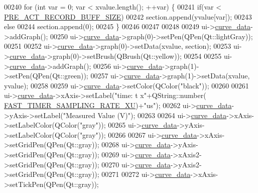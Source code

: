 \begin{DoxyCode}
00240     \textcolor{keywordflow}{for} (\textcolor{keywordtype}{int} var = 0; var < xvalue.length(); ++var) \{
00241         \textcolor{keywordflow}{if}(var < \hyperlink{a00006_a18dcecc16ded13fa622e0913e73442e6}{PRE\_ACT\_RECORD\_BUFF\_SIZE})
00242         section.append(yvalue[var]);
00243         \textcolor{keywordflow}{else}
00244         section.append(0);
00245     \}
00246 
00247 
00248 
00249     ui->\hyperlink{a00081_a247d94481323c0bc4f8b6458a8a535dd}{curve\_data}->addGraph();
00250     ui->\hyperlink{a00081_a247d94481323c0bc4f8b6458a8a535dd}{curve\_data}->graph(0)->setPen(QPen(Qt::lightGray));
00251 
00252     ui->\hyperlink{a00081_a247d94481323c0bc4f8b6458a8a535dd}{curve\_data}->graph(0)->setData(xvalue, section);
00253     ui->\hyperlink{a00081_a247d94481323c0bc4f8b6458a8a535dd}{curve\_data}->graph(0)->setBrush(QBrush(Qt::yellow));
00254 
00255     ui->\hyperlink{a00081_a247d94481323c0bc4f8b6458a8a535dd}{curve\_data}->addGraph();
00256     ui->\hyperlink{a00081_a247d94481323c0bc4f8b6458a8a535dd}{curve\_data}->graph(1)->setPen(QPen(Qt::green));
00257     ui->\hyperlink{a00081_a247d94481323c0bc4f8b6458a8a535dd}{curve\_data}->graph(1)->setData(xvalue, yvalue);
00258 
00259      ui->\hyperlink{a00081_a247d94481323c0bc4f8b6458a8a535dd}{curve\_data}->setColor(QColor(\textcolor{stringliteral}{"black"}));
00260 
00261     ui->\hyperlink{a00081_a247d94481323c0bc4f8b6458a8a535dd}{curve\_data}->xAxis->setLabel(\textcolor{stringliteral}{"time:  t x"}+QString::number(
      \hyperlink{a00086_a87ea9a0eaa474d8b8f672cfa5cbb091f}{FAST\_TIMER\_SAMPLING\_RATE\_XU})+\textcolor{stringliteral}{"us"});
00262     ui->\hyperlink{a00081_a247d94481323c0bc4f8b6458a8a535dd}{curve\_data}->yAxis->setLabel(\textcolor{stringliteral}{"Measured Value (V)"});
00263 
00264     ui->\hyperlink{a00081_a247d94481323c0bc4f8b6458a8a535dd}{curve\_data}->xAxis->setLabelColor(QColor(\textcolor{stringliteral}{"gray"}));
00265     ui->\hyperlink{a00081_a247d94481323c0bc4f8b6458a8a535dd}{curve\_data}->yAxis->setLabelColor(QColor(\textcolor{stringliteral}{"gray"}));
00266 
00267     ui->\hyperlink{a00081_a247d94481323c0bc4f8b6458a8a535dd}{curve\_data}->xAxis->setGridPen(QPen(Qt::gray));
00268     ui->\hyperlink{a00081_a247d94481323c0bc4f8b6458a8a535dd}{curve\_data}->yAxis->setGridPen(QPen(Qt::gray));
00269     ui->\hyperlink{a00081_a247d94481323c0bc4f8b6458a8a535dd}{curve\_data}->xAxis2->setGridPen(QPen(Qt::gray));
00270     ui->\hyperlink{a00081_a247d94481323c0bc4f8b6458a8a535dd}{curve\_data}->yAxis2->setGridPen(QPen(Qt::gray));
00271 
00272     ui->\hyperlink{a00081_a247d94481323c0bc4f8b6458a8a535dd}{curve\_data}->xAxis->setTickPen(QPen(Qt::gray));

\end{DoxyCode}
